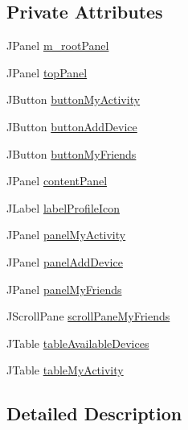 \subsection*{Private Attributes}
\begin{DoxyCompactItemize}
\item 
J\+Panel \hyperlink{classcom_1_1activitytracker_1_1_main_window_ac3d61c032aef87f12b1ae6f7dbf482c3}{m\+\_\+root\+Panel}
\item 
J\+Panel \hyperlink{classcom_1_1activitytracker_1_1_main_window_a6baf76b2b8ede1ba82fc6d096ddb580b}{top\+Panel}
\item 
J\+Button \hyperlink{classcom_1_1activitytracker_1_1_main_window_adec15801f8e16f769bd954e351a663fa}{button\+My\+Activity}
\item 
J\+Button \hyperlink{classcom_1_1activitytracker_1_1_main_window_af241d0ee8023ed099caa204419d74ccb}{button\+Add\+Device}
\item 
J\+Button \hyperlink{classcom_1_1activitytracker_1_1_main_window_a4d9543db1723fd7d1921f07cc92e2abb}{button\+My\+Friends}
\item 
J\+Panel \hyperlink{classcom_1_1activitytracker_1_1_main_window_aaa5ce3b10bff65231c65a3d4b33724b0}{content\+Panel}
\item 
J\+Label \hyperlink{classcom_1_1activitytracker_1_1_main_window_a05a555ba49d30b00573d07e5acd39e0a}{label\+Profile\+Icon}
\item 
J\+Panel \hyperlink{classcom_1_1activitytracker_1_1_main_window_a89833c824727a496f4a889177d4d3f3c}{panel\+My\+Activity}
\item 
J\+Panel \hyperlink{classcom_1_1activitytracker_1_1_main_window_a02f203d3c00a61d838fcee4657984584}{panel\+Add\+Device}
\item 
J\+Panel \hyperlink{classcom_1_1activitytracker_1_1_main_window_afc5efa70337b4b072b38c2cc30991473}{panel\+My\+Friends}
\item 
J\+Scroll\+Pane \hyperlink{classcom_1_1activitytracker_1_1_main_window_a4ef571b624e78e91f3ccad9234c0b5d3}{scroll\+Pane\+My\+Friends}
\item 
J\+Table \hyperlink{classcom_1_1activitytracker_1_1_main_window_a50012386053e035e7ae0fb993153b225}{table\+Available\+Devices}
\item 
J\+Table \hyperlink{classcom_1_1activitytracker_1_1_main_window_a0ad6d3ca1298275eba15a9ea189d4d9b}{table\+My\+Activity}
\end{DoxyCompactItemize}


\subsection{Detailed Description}


